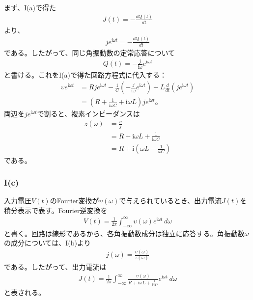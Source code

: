 \documentclass[platex,dvipdfmx,a4paper]{jsarticle}
\newcommand{\bbn}[2]{\frac{d #1}{d #2}}
\begin{document}
  まず、I(a)で得た
  \begin{align*}
    J(t)=-\bbn{Q(t)}{t}
  \end{align*}
  より、
  \begin{align*}
    je^{\mathrm{i}\omega t}=-\bbn{Q(t)}{t}
  \end{align*}
  である。したがって、同じ角振動数の定常応答について
  \begin{align*}
    Q(t)=-\frac{j}{\mathrm{i}\omega}e^{\mathrm{i}\omega t}
  \end{align*}
  と書ける。これをI(a)で得た回路方程式に代入する：
  \begin{align*}
    \upsilon e^{\mathrm{i}\omega t}
    &= Rje^{\mathrm{i}\omega t}
      -\frac{1}{C}\left(-\frac{j}{\mathrm{i}\omega}e^{\mathrm{i}\omega t}\right)
      +L\bbn{}{t}\left(je^{\mathrm{i}\omega t}\right) \\
    &= \left(R+\frac{1}{\mathrm{i}\omega C}+\mathrm{i}\omega L\right)je^{\mathrm{i}\omega t}。
  \end{align*}
  両辺を$je^{\mathrm{i}\omega t}$で割ると、複素インピーダンスは
  \begin{align*}
    z(\omega)
    &=\frac{\upsilon}{j} \\
    &=R+\mathrm{i}\omega L+\frac{1}{\mathrm{i}\omega C} \\
    &=R+\mathrm{i}\left(\omega L-\frac{1}{\omega C}\right)
  \end{align*}
  である。

  \subsubsection*{I(c)}

  入力電圧$V(t)$のFourier変換が$\upsilon(\omega)$で与えられているとき、出力電流$J(t)$を積分表示で表す。Fourier逆変換を
  \begin{align*}
    V(t)=\frac{1}{2\pi}\int_{-\infty}^{\infty}\upsilon(\omega)e^{\mathrm{i}\omega t}\,d\omega
  \end{align*}
  と書く。回路は線形であるから、各角振動数成分は独立に応答する。角振動数$\omega$の成分については、I(b)より
  \begin{align*}
    j(\omega)=\frac{\upsilon(\omega)}{z(\omega)}
  \end{align*}
  である。したがって、出力電流は
  \begin{align*}
    J(t)
    =\frac{1}{2\pi}\int_{-\infty}^{\infty}
    \frac{\upsilon(\omega)}{R+\mathrm{i}\omega L+\frac{1}{\mathrm{i}\omega C}}
    e^{\mathrm{i}\omega t}\,d\omega
  \end{align*}
  と表される。
\end{document}
